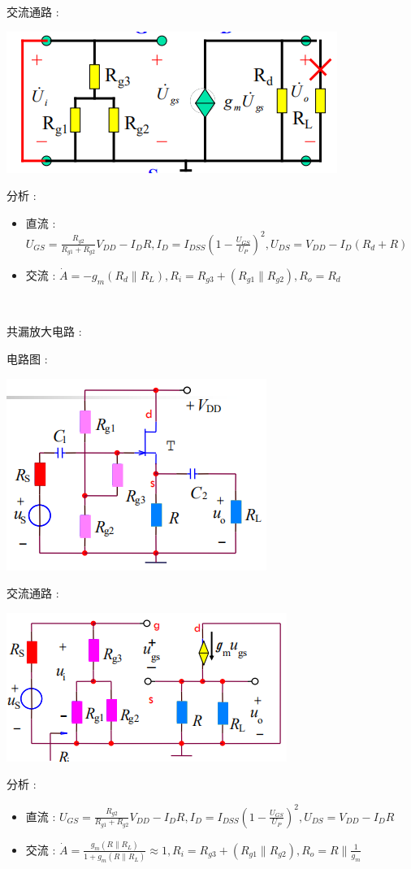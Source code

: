 \documentclass[UTF8, 12pt]{ctexart}
\begin{document}
	交流通路 :

	\includegraphics[scale = 0.4]{02/共源放大电路交流通路.png}

	分析 :
	\begin{itemize}[leftmargin = 4em]
		\item 直流 : $ U_{GS} = \frac{R_{g2}}{R_{g1}+R_{g2}}V_{DD} - I_{D}R, I_{D} = I_{DSS}(1-\frac{U_{GS}}{U_{P}})^{2}, U_{DS} = V_{DD} - I_{D}(R_{d}+R) $
		\item 交流 : $ \dot{A} = -g_{m}(R_{d} \parallel R_{L}), R_{i} = R_{g3} + (R_{g1} \parallel R_{g2}), R_{o} = R_{d} $
	\end{itemize}

	~

	\noindent
	共漏放大电路 :

	电路图 :

	\includegraphics[scale = 0.4]{02/共漏放大电路电路图.png}

	交流通路 :

	\includegraphics[scale = 0.4]{02/共漏放大电路交流通路.png}

	分析 :
	\begin{itemize}[leftmargin = 4em]
		\item 直流 : $ U_{GS} = \frac{R_{g2}}{R_{g1}+R_{g2}}V_{DD} - I_{D}R, I_{D} = I_{DSS}(1-\frac{U_{GS}}{U_{P}})^{2}, U_{DS} = V_{DD} - I_{D}R $
		\item 交流 : $ \dot{A} = \frac{g_{m}(R \parallel R_{L})}{1+g_{m}(R \parallel R_{L})} \approx 1, R_{i} = R_{g3} + (R_{g1} \parallel R_{g2}), R_{o} = R \parallel \frac{1}{g_{m}} $
	\end{itemize}
\end{document}
